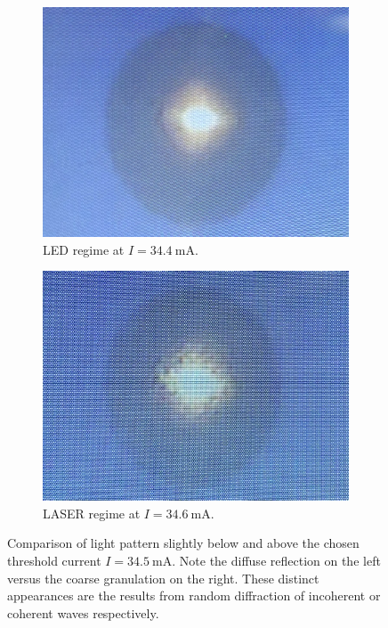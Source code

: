 \begin{figure}[H]
    \begin{subfigure}{0.48\textwidth}
        \centering
        \includegraphics[width=\linewidth]{content/measurement/led.jpg}
        \caption{LED regime at $I = \qty{34.4}{\milli\ampere}$.}
        \label{fig:pattern_led}
    \end{subfigure}
    \hfill
    \begin{subfigure}{0.48\textwidth}
        \centering
        \includegraphics[width=\linewidth]{content/measurement/laser.jpg}
        \caption{LASER regime at $I = \qty{34.6}{\milli\ampere}$.}
        \label{fig:pattern_laser}
    \end{subfigure}
    \caption{Comparison of light pattern slightly below and above the chosen threshold current $I = \qty{34.5}{\milli\ampere}$.
             Note the diffuse reflection on the left versus the coarse granulation on the right. These distinct appearances
             are the results from random diffraction of incoherent or coherent waves respectively.}
    \label{fig:pattern}
\end{figure}

